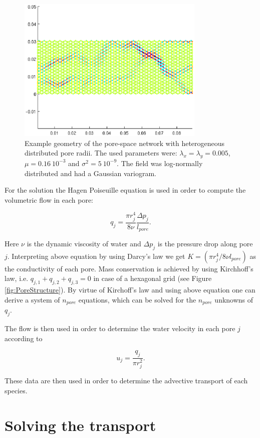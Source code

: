 \documentclass[12pt]{report}
\begin{document}
\begin{figure}[ht]
	\centering
	\includegraphics[width=0.8\textwidth]{MainPoreNetwork_03}
	\caption[]{Example geometry of the pore-space network with heterogeneous distributed pore radii. The used parameters were: $\lambda_x = \lambda_y = 0.005$, $\mu = 0.16\ 10^{-3}$ and $\sigma^2 = 5\ 10^{-9}$. The field was log-normally distributed and had a Gaussian variogram.}
	\label{fig:flow}
\end{figure}

For the solution the Hagen Poiseuille equation is used in order to compute the volumetric flow in each pore:

$$
	q_j = \frac{\pi r^4_j}{8 \nu} \frac{\Delta p_j}{l_{pore}}.
$$

Here $\nu$ is the dynamic viscosity of water and $\Delta p_j $ is the pressure drop along pore $j$. Interpreting above equation by using Darcy's law we get $K = (\pi r^4_j/8 \nu l_{pore})$ as the conductivity of each pore. Mass conservation is achieved by using Kirchhoff's law, i.e. $q_{j,1} + q_{j,2} + q_{j,3} = 0$ in case of a hexagonal grid (see Figure \ref{fig:PoreStructure}). By virtue of Kirchoff's law and using above equation one can derive a system of $n_{pore}$ equations, which can be solved for the $n_{pore}$ unknowns of $q_j$.

The flow is then used in order to determine the water velocity in each pore $j$ according to

$$ 
	u_j = \frac{q_j}{\pi r_j^2}. 
$$ 

These data are then used in order to determine the advective transport of each species.

\section{Solving the transport}
\end{document}
